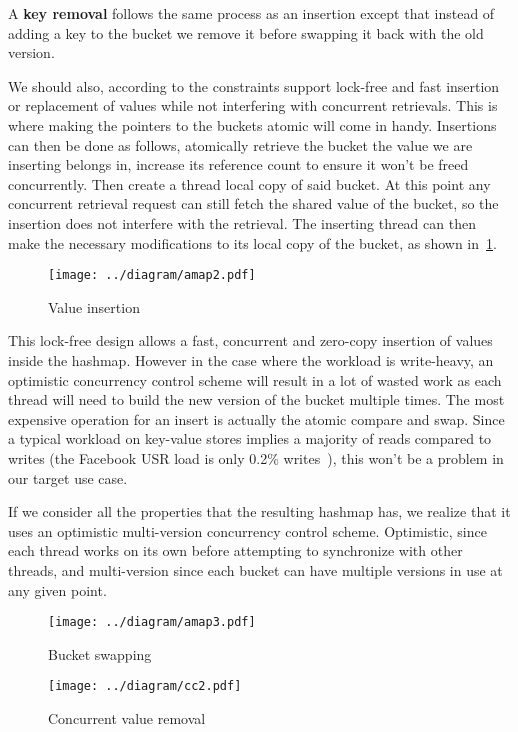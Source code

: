 A \textbf{key removal} follows the same process as an insertion except
that instead of adding a key to the bucket we remove it before
swapping it back with the old version.

We should also, according to the constraints support lock-free and
fast insertion or replacement of values while not interfering with
concurrent retrievals. This is where making the pointers to the
buckets atomic will come in handy. Insertions can then be done as
follows, atomically retrieve the bucket the value we are inserting
belongs in, increase its reference count to ensure it won't be freed
concurrently. Then create a thread local copy of said bucket. At this
point any concurrent retrieval request can still fetch the shared
value of the bucket, so the insertion does not interfere with the
retrieval. The inserting thread can then make the necessary
modifications to its local copy of the bucket, as shown
in~\ref{fig:omvcc-insert}.

\begin{figure}[htb!]
  \texttt{[image: ../diagram/amap2.pdf]}
  \caption{Value insertion}
  \label{fig:omvcc-insert}
\end{figure}

This lock-free design allows a fast, concurrent and zero-copy
insertion of values inside the hashmap. However in the case where the
workload is write-heavy, an optimistic concurrency control scheme will
result in a lot of wasted work as each thread will need to build
the new version of the bucket multiple times. The most expensive
operation for an insert is actually the atomic compare and swap. Since
a typical workload on key-value stores implies a majority of reads
compared to writes (the Facebook USR load is only 0.2\%
writes~\cite{memcached}), this won't be a problem in our target use
case.

If we consider all the properties that the resulting hashmap
has, we realize that it uses an optimistic multi-version concurrency
control scheme. Optimistic, since each thread works on its own before
attempting to synchronize with other threads, and multi-version since
each bucket can have multiple versions in use at any given point.

\begin{figure}
  \texttt{[image: ../diagram/amap3.pdf]}
  \caption{Bucket swapping}
  \label{fig:omvcc-swap}
\end{figure}

\begin{figure}[htb!]
  \texttt{[image: ../diagram/cc2.pdf]}
  \caption{Concurrent value removal}
  \label{fig:cc2}
\end{figure}

